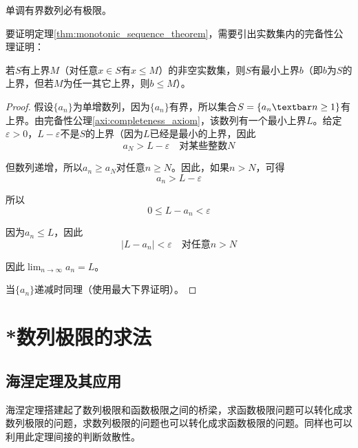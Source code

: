 \begin{theorem}[单调数列定理] \label{thm:monotonic_sequence_theorem}
    单调有界数列必有极限。
\end{theorem}

要证明定理\ref{thm:monotonic_sequence_theorem}，需要引出实数集内的完备性公理证明：
\begin{axiom}[完备性公理] \label{axi:completeness_axiom}
    若$S$有上界$M$（对任意$x\in S$有$x\leq M$）的非空实数集，则$S$有最小上界$b$（即$b$为$S$的上界，但若$M$为任一其它上界，则$b\leq M$）。
\end{axiom}

\begin{proof}
    假设$\{a_n\}$为单增数列，因为$\{a_n\}$有界，所以集合$S=\{ a_n\textbar n\geq 1\}$有上界。由完备性公理\ref{axi:completeness_axiom}，该数列有一个最小上界$L$。给定$\varepsilon>0$，$L-\varepsilon$不是$S$的上界（因为$L$已经是最小的上界，因此
    \begin{equation}
        a_N > L-\varepsilon \quad \mbox{对某些整数}N \nonumber
    \end{equation}

    但数列递增，所以$a_n\geq a_N$对任意$n\geq N$。因此，如果$n>N$，可得
    \begin{equation}
        a_n > L-\varepsilon \nonumber
    \end{equation}

    所以
    \begin{equation}
        0\leq L-a_n<\varepsilon \nonumber
    \end{equation}

    因为$a_n\leq L$，因此
    \begin{equation}
        \left|L-a_n\right| < \varepsilon \quad \mbox{对任意}n>N \nonumber
    \end{equation}

    因此$\displaystyle\lim_{n\rightarrow \infty}a_n = L$。

    当$\{a_n\}$递减时同理（使用最大下界证明）。
\end{proof}

\section{*数列极限的求法}
\subsection{海涅定理及其应用}
海涅定理搭建起了数列极限和函数极限之间的桥梁，求函数极限问题可以转化成求数列极限的问题，求数列极限的问题也可以转化成求函数极限的问题。同样也可以利用此定理间接的判断敛散性。

